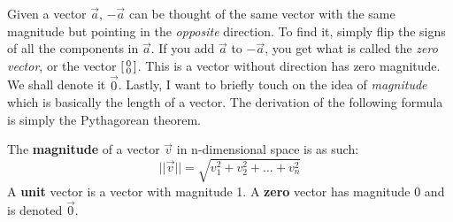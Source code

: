 Given a vector \(\vec{a}\), \(-\vec{a}\) can be thought of the same vector with the same magnitude but pointing in the \textit{opposite} direction. To find it, simply flip the signs of all the components in \(\vec{a}\). If you add \(\vec{a}\) to \(-\vec{a}\), you get what is called the \emph{zero vector}, or the vector \(\begin{bsmallmatrix}
  0 \\
  0
\end{bsmallmatrix}\). This is a vector without direction has zero magnitude. We shall denote it \(\vec{0}\).
Lastly, I want to briefly touch on the idea of \textit{magnitude} which is basically the length of a vector. The derivation of the following formula is simply the Pythagorean theorem.
\begin{definition}
  The \textbf{magnitude} of a vector \(\vec{v}\) in n-dimensional space is as such:
  \begin{equation*}
    ||\vec{v}|| = \sqrt{v_{1}^{2}+v_{2}^{2}+...+v_{n}^{2}} 
  \end{equation*}
  A \textbf{unit} vector is a vector with magnitude 1. A \textbf{zero} vector has magnitude 0 and is denoted \(\vec{0}\).
  \label{vecmagnitude}
\end{definition}


